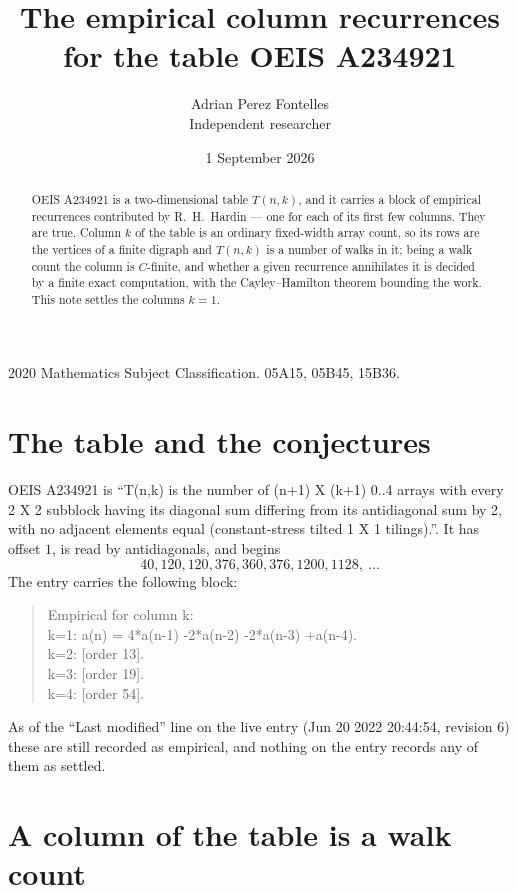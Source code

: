 \documentclass[11pt,a4paper]{article}
\title{The empirical column recurrences for the table OEIS A234921}
\author{Adrian Perez Fontelles\\ \small Independent researcher}
\date{1 September 2026}
\theoremstyle{plain}
\theoremstyle{definition}
\begin{document}
\maketitle

\begin{abstract}
OEIS A234921 is a two-dimensional table $T(n,k)$, and it carries a block of empirical
recurrences contributed by R.~H.~Hardin --- one for each of its first few columns. They are
true. Column $k$ of the table is an ordinary fixed-width array count, so its rows are the
vertices of a finite digraph and $T(n,k)$ is a number of walks in it; being a walk count the
column is $C$-finite, and whether a given recurrence annihilates it is decided by a finite
exact computation, with the Cayley--Hamilton theorem bounding the work. This note settles the columns $k=1$.
\end{abstract}

\noindent\small 2020 Mathematics Subject Classification. 05A15, 05B45, 15B36.\normalsize

\section{The table and the conjectures}

OEIS A234921 is ``T(n,k) is the number of (n+1) X (k+1) 0..4 arrays with every 2 X 2 subblock having its diagonal sum differing from its antidiagonal sum by 2, with no adjacent elements equal (constant-stress tilted 1 X 1 tilings).''. It has offset $1$, is
read by antidiagonals, and begins
\[
40, 120, 120, 376, 360, 376, 1200, 1128,\ \dots
\]
The entry carries the following block:
\begin{quote}\small
Empirical for column k:\\
k=1: a(n) = 4*a(n-1) -2*a(n-2) -2*a(n-3) +a(n-4).\\
k=2: [order 13].\\
k=3: [order 19].\\
k=4: [order 54].\\
\end{quote}
As of the ``Last modified'' line on the live entry (Jun 20 2022 20:44:54, revision 6) these are still
recorded as empirical, and nothing on the entry records any of them as settled.

\section{A column of the table is a walk count}
\end{document}
